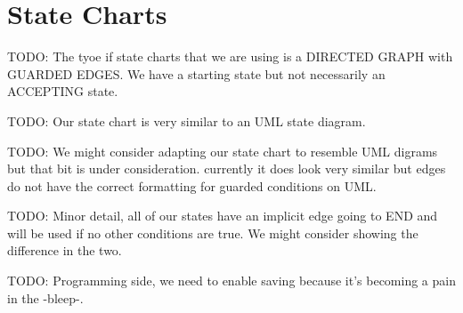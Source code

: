 \section{State Charts}

TODO: The tyoe if state charts that we are using is a DIRECTED GRAPH with GUARDED EDGES. We have a starting state but not necessarily an ACCEPTING state.

TODO: Our state chart is very similar to an UML state diagram.

TODO: We might consider adapting our state chart to resemble UML digrams but that bit is under consideration. currently it does look very similar but edges do not have the correct formatting for guarded conditions on UML.

TODO: Minor detail, all of our states have an implicit edge going to END and will be used if no other conditions are true. We might consider showing the difference in the two.

TODO: Programming side, we need to enable saving because it's becoming a pain in the -bleep-.
